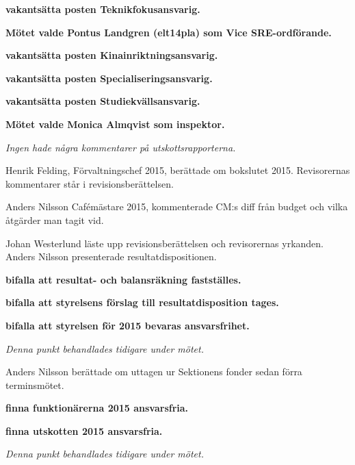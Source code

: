 \documentclass[10pt]{article}
\begin{document}
\begin{paragrafer}
\begin{paragrafer}
    \textbf{\Mba vakantsätta posten Teknikfokusansvarig.}\par
    \textbf{Mötet valde Pontus Landgren (elt14pla) som Vice SRE-ordförande.}\par
    \textbf{\Mba vakantsätta posten Kinainriktningsansvarig.}\par
    \textbf{\Mba vakantsätta posten Specialiseringsansvarig.}\par
    \textbf{\Mba vakantsätta posten Studiekvällsansvarig.}

    \textbf{Mötet valde Monica Almqvist som inspektor.}

\end{paragrafer}

\emph{Ingen hade några kommentarer på utskottsrapporterna.}

Henrik Felding, Förvaltningschef 2015, berättade om bokslutet 2015. Revisorernas kommentarer står i revisionsberättelsen.

Anders Nilsson Cafémästare 2015, kommenterade CM:s diff från budget och vilka åtgärder man tagit vid.

Johan Westerlund läste upp revisionsberättelsen och revisorernas yrkanden. Anders Nilsson presenterade resultatdispositionen.

\textbf{\Mba bifalla att resultat- och balansräkning fastställes.}

\textbf{\Mba bifalla att styrelsens förslag till resultatdisposition tages.}

\textbf{\Mba bifalla att styrelsen för 2015 bevaras ansvarsfrihet.}

\emph{Denna punkt behandlades tidigare under mötet.}

Anders Nilsson berättade om uttagen ur Sektionens fonder sedan förra terminsmötet.

    \begin{paragrafer}
        \textbf{\Mba finna funktionärerna 2015 ansvarsfria.}

        \textbf{\Mba finna utskotten 2015 ansvarsfria.}

        \emph{Denna punkt behandlades tidigare under mötet.}


\end{paragrafer}
\end{paragrafer}
\end{document}
